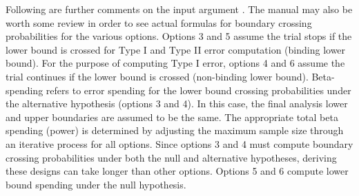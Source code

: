 \begin{Details}
Following are further comments on the input argument .
The manual may also be worth some review in order to see actual formulas for boundary crossing 
probabilities for the various options. 
Options 3 and 5 assume the trial stops if the lower bound is crossed for Type I and Type II error computation 
(binding lower bound). 
For the purpose of computing Type I error, options 4 and 6 assume the trial continues if the lower bound is crossed 
(non-binding lower bound). Beta-spending refers to error spending for the lower bound crossing probabilities
under the alternative hypothesis (options 3 and 4).
In this case, the final analysis lower and upper boundaries are assumed to be the same.
The appropriate total beta spending (power) is determined by adjusting the maximum sample size
through an iterative process for all options.
Since options 3 and 4 must compute boundary crossing probabilities under both the null and alternative hypotheses,
deriving these designs can take longer than other options.
Options 5 and 6 compute lower bound spending under the null hypothesis.
\end{Details}
